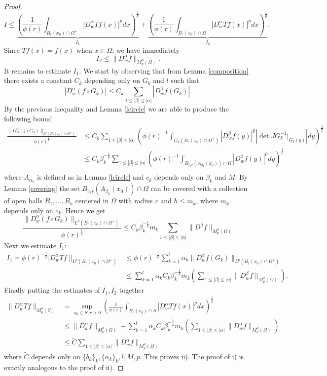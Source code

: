 \documentclass[12pt]{article}
\theoremstyle{definition}
\begin{document}
\begin{proof}
\[ I \le \underbrace{\left ( \frac{1}{\phi(r)} \int_{B_r(x_0)\cap \Omega^+} |D^\alpha_w Tf(x)|^pdx \right)^{\frac{1}{p}}}_\textrm{$I_1$}+\underbrace{\left ( \frac{1}{\phi(r)} \int_{B_r(x_0)\cap \Omega} |D^\alpha_w Tf(x)|^pdx \right)^{\frac{1}{p}}}_\textrm{$I_2$}.\]
Since $Tf(x)=f(x)$ when $ x\in\Omega$, we have immediately  
\[ I_2 \le \|D^\alpha_w f \|_{M_p^\phi(\Omega)} . \]
It remains to estimate $I_1$. We start by observing that from Lemma \ref{composition} there exists a constant $C_k$ depending only on $G_k$ and $l$ such that
\[ |D^{\alpha}_w (f \circ  G_k)| \le C_k \sum_{1\le |\beta|\le|\alpha| }| D^{\beta}_wf(G_k)|.\]
By the previous inequality and Lemma \ref{lcircle} we are able to produce the following bound
\begin{align*}
 \frac{\|D^{\alpha}_w(f \circ G_k) \|_{L^p(B_r(x_0)\cap \Omega^+)}}{\phi(r)^{\frac{1}{p}}} &\le C_k \sum_{1\le |\beta|\le|\alpha| } \left(\phi(r)^{-1} \int_{G_k(B_r(x_0)\cap \Omega^+)} |D^\beta_wf(y)|^p|\det JG_k^{-1}\big|_{G_k(y)}|dy\right)^{\frac{1}{p}}\\
 		&\le C_k \beta_k^{-\frac{1}{p}} \sum_{1\le |\beta|\le|\alpha| } \left(\phi(r)^{-1} \int_{B_{c_kr}(A_{\beta_k}(x_0))\cap \Omega} |D^\beta_wf(y)|^pdy\right)^{\frac{1}{p}} 		\\		
\end{align*}
where $A_{\alpha_k}$ is defined as in Lemma \ref{lcircle} and $c_k$ depends only on $\beta_k$ and $M$. By Lemma \ref{covering} the set $B_{c_kr}(A_{\beta_k}(x_0))\cap \Omega$ can be covered with a collection of open balls $B_1,...,B_h$ centered in $\Omega$ with radius $r$ and $h\le m_k$, where $m_k$ depends only on $c_k$. Hence we get
\[ \frac{\|D^{\alpha}_w(f \circ G_k) \|_{L^p(B_r(x_0)\cap \Omega^+)}}{\phi(r)^{\frac{1}{p}}}\le C_k \beta_k^{-\frac{1}{p}} m_k \sum_{1\le |\beta|\le|\alpha| } \|D^\beta f\|_{M_p^\phi(\Omega)}\]
 Next we estimate $I_1$:
\begin{align*}
I_1 = \phi(r)^{-\frac{1}{p}}|D^\alpha_w Tf \|_{L^p(B_r(x_0)\cap \Omega^+)}&\le \phi(r)^{-\frac{1}{p}} \sum_{k=1}^l \alpha_k \|D^\alpha_w f(G_k) \|_{L^p(B_r(x_0)\cap \Omega^+)} \\
&\le \sum_{k=1}^l \alpha_kC_k\beta_k^{-\frac{1}{p}}m_k \left( \sum_{1\le |\beta|\le|\alpha| }\| D^\beta_wf\|_{M_p^\phi(\Omega)} \right).																	
\end{align*}
Finally putting the estimates of $I_1,I_2$ together 
\begin{align*}
\| D^\alpha_w Tf\|_{M_p^\phi(S)}&=\sup_{x_0 \in S, r>0} \left ( \frac{1}{\phi(r)} \int_{B_r(x_0)\cap S} |D^\alpha_w Tf(x)|^pdx \right)^{\frac{1}{p}} \\
									&\le \|D^\alpha_w f \|_{M_p^\phi(\Omega)}+\sum_{k=1}^l \alpha_kC_k\beta_k^{-\frac{1}{p}}m_k \left( \sum_{1\le |\beta|\le|\alpha| }\| D^\alpha_wf\|_{M_p^\phi(\Omega)} \right) \\
									& \le \widetilde C\sum_{1\le |\beta|\le|\alpha| }\| D^\alpha_wf\|_{M_p^\phi(\Omega)}
\end{align*}
where $\widetilde C$ depends only on $\{b_k\}_k,\{\alpha_k\}_k,l,M,p$. This proves ii). The proof of i) is exactly analogous to the proof of ii).
\end{proof}
		
\end{document}
